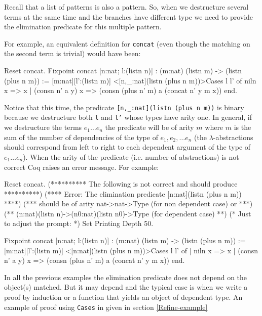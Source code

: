 Recall that a list of patterns is also a pattern. So, when
we destructure several terms at the same time and the branches have
different type  we need to provide
the elimination predicate for this multiple pattern.

For example, an equivalent definition for \texttt{concat} (even though the matching on the second term is trivial) would have
been:

\begin{coq_example}
Reset concat.
Fixpoint concat [n:nat; l:(listn n)]
     : (m:nat) (listn m) -> (listn (plus n m)) :=
  [m:nat][l':(listn m)] 
    <[n,_:nat](listn (plus n m))>Cases l l' of 
          niln          x => x
       | (consn n' a y) x => (consn (plus n' m) a (concat n' y m x))
                  end.
\end{coq_example}

Notice that this time, the predicate \texttt{[n,\_:nat](listn (plus n
  m))}  is binary because we
destructure both \texttt{l} and \texttt{l'} whose types have arity one.
In general, if we destructure the terms $e_1\ldots e_n$
the predicate will be of arity $m$ where $m$ is the sum of the
number of dependencies of the type of $e_1, e_2,\ldots e_n$ 
(the $\lambda$-abstractions
should correspond from left to right to each dependent argument of the
type of $e_1\ldots e_n$).
When the arity of the predicate (i.e. number of abstractions) is not
correct Coq raises an error message. For example:

\begin{coq_eval}
Reset concat.
(********** The following is not correct and should produce **********)
(**** Error: The elimination predicate [n:nat](listn (plus n m))  ****)
(*** should be of arity nat->nat->Type (for non dependent case) or ***)
(** (n:nat)(listn n)->(n0:nat)(listn n0)->Type (for dependent case) **)
(* Just to adjust the prompt: *) Set Printing Depth 50.
\end{coq_eval}

\begin{coq_example}
Fixpoint concat [n:nat; l:(listn n)] 
     : (m:nat) (listn m) -> (listn (plus n m)) := 
  [m:nat][l':(listn m)] 
   <[n:nat](listn (plus n m))>Cases l l' of 
        | niln          x => x
        | (consn n' a y) x => (consn (plus n' m) a (concat n' y m x))
        end.
\end{coq_example}

In all the previous examples the elimination predicate does not depend
on the object(s) matched. But it may depend and the typical case 
is when we write a proof by induction or a function that yields an
object of dependent type. An example of proof using \texttt{Cases} in
given in section \ref{Refine-example}

